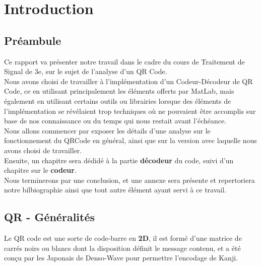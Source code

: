 \documentclass{report}
\title{}
\author{Nicolas \bsc{Sias}, Youri \bsc{Mouton}, Samuel \bsc{Monroe}}
\date{30 Mai 2015}
\begin{document}
\maketitle

\newpage
\thispagestyle{empty}
\mbox{}

\tableofcontents

\chapter{Introduction}

	\section{Préambule}

		Ce rapport va présenter notre travail dans le cadre du cours de Traitement de Signal de 3e, sur le sujet de l'analyse d'un QR Code.\\

		Nous avons choisi de travailler à l'implémentation d'un Codeur-Décodeur de QR Code, ce en utilisant principalement les éléments offerts par MatLab, mais également en utilisant certains outils ou librairies lorsque des éléments de l'implémentation se révélaient trop techniques où ne pouvaient être accomplis sur base de nos connaissance ou du temps qui nous restait avant l'échéance.\\

		Nous allons commencer par exposer les détails d'une analyse sur le fonctionnement du QRCode en général, ainsi que sur la version avec laquelle nous avons choisi de travailler.\\
		Ensuite, un chapitre sera dédidé à la partie \textbf{décodeur} du code, suivi d'un chapitre sur le \textbf{codeur}.\\
		Nous terminerons par une conclusion, et une annexe sera présente et repertoriera notre bilbiographie ainsi que tout autre élément ayant servi à ce travail.\\

	\section{QR - Généralités}

		Le QR code est une sorte de code-barre en \textbf{2D}, il est formé d'une matrice de carrés noirs ou blancs dont la disposition définit le message contenu, et a été conçu par les Japonais de Denso-Wave pour permettre l'encodage de Kanji.\\
\end{document}

